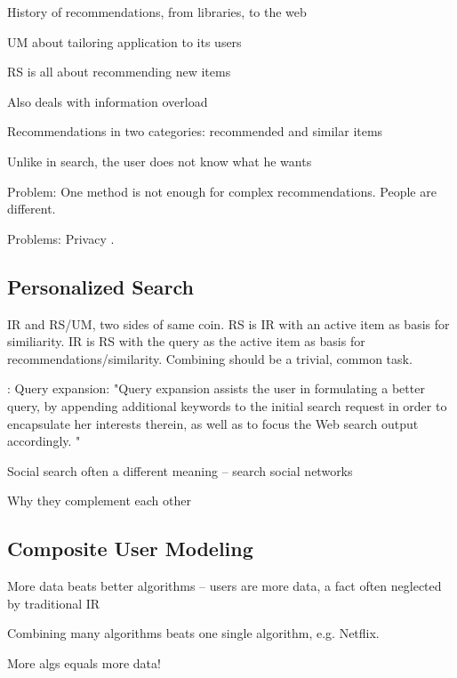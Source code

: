 \begin{itemize*}
  \item History of recommendations, from libraries, to the web
  \item UM about tailoring application to its users
  \item RS is all about recommending new items
  \item Also deals with information overload
  \item Recommendations in two categories: recommended and similar items
  \item Unlike in search, the user does not know what he wants
  \item Problem: One method is not enough for complex recommendations. People are different.
  \item Problems: Privacy \cite[p3]{Micarelli2007}.
\end{itemize*}



\subsection{Personalized Search}

IR and RS/UM, two sides of same coin.
RS is IR with an active item as basis for similiarity.
IR is RS with the query as the active item as basis for recommendations/similarity.
Combining should be a trivial, common task.

\cite[p1]{Chirita2010}: Query expansion:
"Query expansion assists the user in formulating a better query, by appending additional keywords to the initial search request in order to encapsulate her interests therein, as well as to focus the Web search output accordingly. "

\begin{itemize*}
  \item Social search often a different meaning -- search social networks
  \item Why they complement each other
\end{itemize*}



\subsection{Composite User Modeling}

\begin{itemize*}
  \item More data beats better algorithms -- users are more data, 
        a fact often neglected by traditional IR
  \item Combining many algorithms beats one single algorithm, e.g. Netflix.
  \item More algs equals more data!
\end{itemize*}

